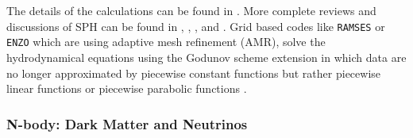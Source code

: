 The details of the calculations can
be found in \cite{Price2012}. More complete reviews and discussions of SPH can be found in \cite{Monaghan1992},
\cite{Monaghan2005}, \cite{Rosswog2009}, \cite{Springel2010} and  \cite{Price2011}. Grid based codes like \texttt{RAMSES} \citep{Teyssier2002} or \texttt{ENZO} \citep{Bryan2013} which are using adaptive mesh
refinement (AMR), solve the hydrodynamical equations using the Godunov scheme \citep{Godunov1959} extension in which data are no longer approximated by piecewise constant functions but rather piecewise linear functions \citep{VanLeer1979} or piecewise parabolic functions \citep{Colella1984, Woodward1984}.

\subsubsection{N-body: Dark Matter and Neutrinos}
\label{sec:nbody}

